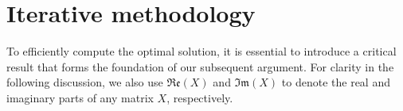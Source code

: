 \documentclass[sn-mathphys-num]{sn-jnl}%
\theoremstyle{thmstyleone}%
\theoremstyle{thmstyletwo}%
\theoremstyle{thmstylethree}%
\begin{document}
%
%
%

\section{Iterative methodology}
To efficiently compute the optimal solution, it is essential to introduce a critical result that forms the foundation of our subsequent argument. For clarity in the following discussion, we also use $\mathfrak {Re}(X)$ and $\mathfrak{Im}(X)$ to denote the real and imaginary parts of any matrix $X$, respectively.
\end{document}

